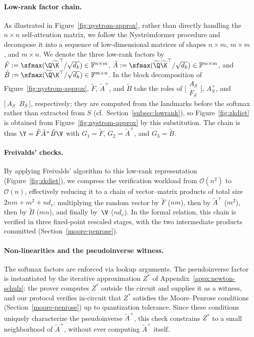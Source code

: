 \paragraph{Low-rank factor chain.}
As illustrated in Figure~\ref{fig:nystrom-approx}, rather than directly handling the $n \times n$ self-attention matrix, we follow the Nystr\"omformer procedure and decompose it into a sequence of low-dimensional matrices of shapes $n \times m$, $m \times m$, and $m \times n$. We denote the three low-rank factors by
$\tilde{F} := \sfmax(\Q\widetilde{\K}^{\top}/\sqrt{d_k}) \in \mathbb{F}^{n \times m}$,
$\tilde{A} := \sfmax(\widetilde{\Q}\widetilde{\K}^{\top}/\sqrt{d_k}) \in \mathbb{F}^{m \times m}$, and
$\tilde{B} := \sfmax(\widetilde{\Q}\K^{\top}/\sqrt{d_k}) \in \mathbb{F}^{m \times n}$.
In the block decomposition of Figure~\ref{fig:nystrom-approx}, $\tilde{F}$, $\tilde{A}^{+}$, and $\tilde{B}$ take the roles of
$\bigl[\begin{smallmatrix} A_S \\ F_S \end{smallmatrix}\bigr]$,
$A_S^{+}$, and $\bigl[\, A_S \;\; B_S \,\bigr]$, respectively;
they are computed from the landmarks before the softmax rather than extracted from $S$ (cf.\ Section~\ref{subsec:lowrank}), so Figure~\ref{fig:zkdiet} is obtained from Figure~\ref{fig:nystrom-approx} by this substitution. The chain is thus $\Y = \tilde{F}\tilde{A}^{+}\tilde{B}\V$ with $G_1 = \tilde F$, $G_2 = \tilde A^{+}$, and $G_3 = \tilde B$.

\paragraph{Freivalds' checks.}
By applying Freivalds' algorithm to this low-rank representation (Figure~\ref{fig:zkdiet}), we compress the verification workload from $\mathcal{O}(n^2)$ to $\mathcal{O}(n)$, effectively reducing it to a chain of vector--matrix products of total size $2nm + m^2 + nd_v$: multiplying the random vector by $\tilde{F}$ ($nm$), then by $\tilde{A}^{+}$ ($m^2$), then by $\tilde{B}$ ($mn$), and finally by~$\V$ ($nd_v$). In the formal relation, this chain is verified in three fixed-point rescaled stages, with the two intermediate products committed (Section~\ref{moore-penrose}).

\paragraph{Non-linearities and the pseudoinverse witness.}
The softmax factors are enforced via lookup arguments. The pseudoinverse factor is instantiated by the iterative approximation $Z^{*}$ of Appendix~\ref{appx:newton-schulz}: the prover computes $Z^{*}$ outside the circuit and supplies it as a witness, and our protocol verifies in-circuit that $Z^{*}$ satisfies the Moore--Penrose conditions (Section~\ref{moore-penrose}) up to quantization tolerance. Since these conditions uniquely characterize the pseudoinverse $\tilde{A}^{+}$, this check constrains $Z^{*}$ to a small neighborhood of $\tilde{A}^{+}$, without ever computing $\tilde{A}^{+}$ itself.

